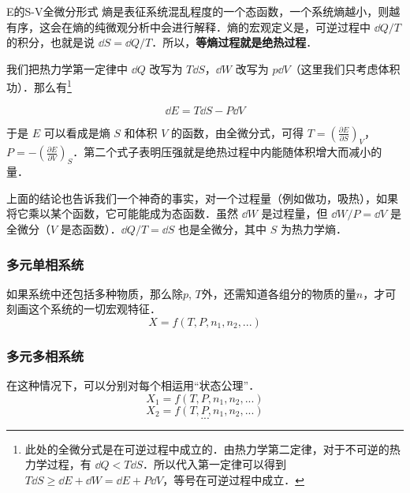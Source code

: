 \begin{example}{E的S-V全微分形式}
熵是表征系统混乱程度的一个态函数，一个系统熵越小，则越有序，这会在熵的纯微观分析中会进行解释．熵的宏观定义是，可逆过程中 $\dd Q/T$ 的积分，也就是说 $\dd S=\dd Q/T$．所以，\textbf{等熵过程就是绝热过程}．

我们把热力学第一定律中 $\dd Q$ 改写为 $T\dd S$，$\dd W$ 改写为 $p\dd V$（这里我们只考虑体积功）．那么有\footnote{
此处的全微分式是在可逆过程中成立的．由热力学第二定律，对于不可逆的热力学过程，有 $\dd Q<T\dd S$．所以代入第一定律可以得到 $T\dd S\ge \dd E+\dd W=\dd E+P\dd V$，等号在可逆过程中成立．
}

\begin{equation}
\dd E=T\dd S-P\dd V
\end{equation}

于是 $E$ 可以看成是熵 $S$ 和体积 $V$ 的函数，由全微分式，可得 $T=\left(\frac{\partial E}{\partial S}\right)_V$，$P=-\left(\frac{\partial E}{\partial V}\right)_S$．第二个式子表明压强就是绝热过程中内能随体积增大而减小的量．

上面的结论也告诉我们一个神奇的事实，对一个过程量（例如做功，吸热），如果将它乘以某个函数，它可能能成为态函数．虽然 $\dd W$ 是过程量，但 $\dd W/P=\dd V$ 是全微分（$V$ 是态函数）．$\dd Q/T=\dd S$ 也是全微分，其中 $S$ 为热力学熵．
\end{example}

\subsubsection{多元单相系统}
如果系统中还包括多种物质，那么除$p$, $T$外，还需知道各组分的物质的量$n$，才可刻画这个系统的一切宏观特征．
\begin{equation}
X=f(T,P,n_1, n_2, ...)
\end{equation}

\subsubsection{多元多相系统}
在这种情况下，可以分别对每个相运用“状态公理”．
\begin{equation}
X_1=f(T,P,n_1, n_2, ...)
\end{equation}
\begin{equation}
X_2=f(T,P,n_1, n_2, ...)
\end{equation}
$$...$$
